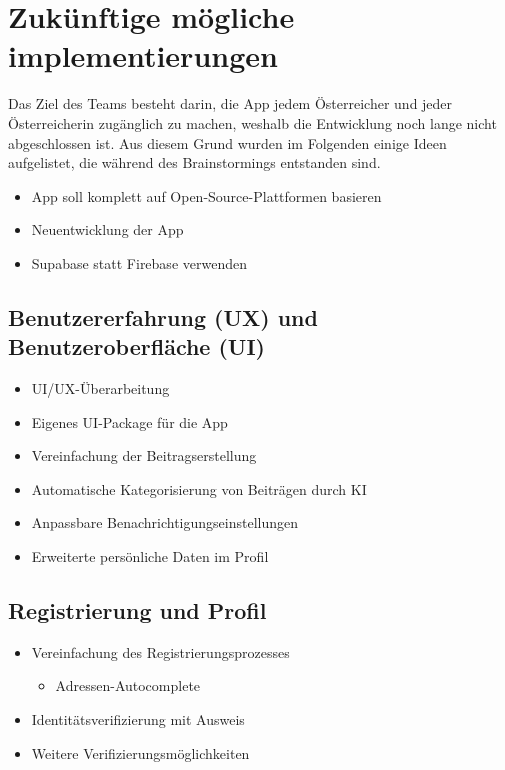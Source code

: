 \section{Zukünftige mögliche implementierungen}

Das Ziel des Teams besteht darin, die App jedem Österreicher und jeder Österreicherin zugänglich zu machen, weshalb die Entwicklung noch lange nicht abgeschlossen ist. Aus diesem Grund wurden im Folgenden einige Ideen aufgelistet, die während des Brainstormings entstanden sind.


\begin{itemize}
    \item App soll komplett auf Open-Source-Plattformen basieren
    \item Neuentwicklung der App
    \item Supabase statt Firebase verwenden
\end{itemize}

\subsection{Benutzererfahrung (UX) und Benutzeroberfläche (UI)}
\begin{itemize}
    \item UI/UX-Überarbeitung
    \item Eigenes UI-Package für die App
    \item Vereinfachung der Beitragserstellung
    \item Automatische Kategorisierung von Beiträgen durch KI
    \item Anpassbare Benachrichtigungseinstellungen
    \item Erweiterte persönliche Daten im Profil
\end{itemize}

\subsection{Registrierung und Profil}
\begin{itemize}
    \item Vereinfachung des Registrierungsprozesses
          \begin{itemize}
              \item Adressen-Autocomplete
          \end{itemize}
    \item Identitätsverifizierung mit Ausweis
    \item Weitere Verifizierungsmöglichkeiten
\end{itemize}

